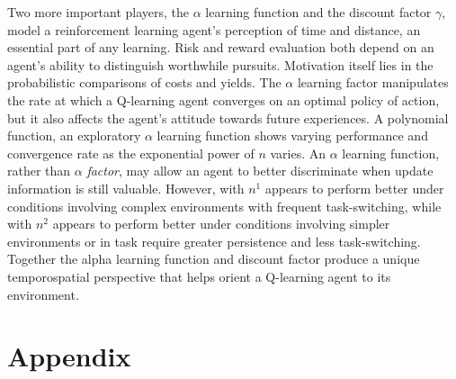 \documentclass[12pt, letter]{article}
\begin{document}
    Two more important players, the $\alpha$ learning function and the discount factor $\gamma$, model a reinforcement learning agent's perception of time and distance, an essential part of any learning.  Risk and reward evaluation both depend on an agent's ability to distinguish worthwhile pursuits.  Motivation itself lies in the probabilistic comparisons of costs and yields.  The $\alpha$ learning factor manipulates the rate at which a Q-learning agent converges on an optimal policy of action, but it also affects the agent's attitude towards future experiences.  A polynomial function, an exploratory $\alpha$ learning function shows varying performance and convergence rate as the exponential power of $n$ varies.  An $\alpha$ learning function, rather than $\alpha$ \emph{factor}, may allow an agent to better discriminate when update information is still valuable.  However,  with $n^1$ appears to perform better under conditions involving complex environments with frequent task-switching, while  with $n^2$ appears to perform better under conditions involving simpler environments or in task require greater persistence and less task-switching.  Together the alpha learning function and discount factor produce a unique temporospatial perspective that helps orient a Q-learning agent to its environment.


\clearpage
\section{Appendix}

\listoffigures

\appendix
\end{document}
